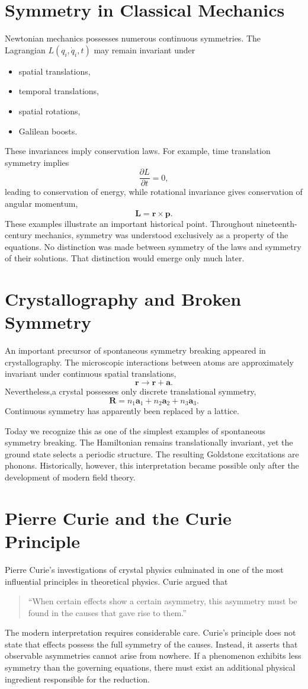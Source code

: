 \section{Symmetry in Classical Mechanics}
Newtonian mechanics possesses numerous continuous symmetries.
The Lagrangian $ L(q_i,\dot q_i,t)$ may remain invariant under
\begin{itemize}
\item spatial translations,
\item temporal translations,
\item spatial rotations,
\item Galilean boosts.
\end{itemize}
These invariances imply conservation laws.
For example,
time translation symmetry implies
\[\frac{\partial L}{\partial t}=0,\]
leading to conservation of energy,
while rotational invariance gives conservation of angular momentum,
\[\mathbf L=\mathbf r\times\mathbf p.\]
These examples illustrate an important historical point.
Throughout nineteenth-century mechanics,
symmetry was understood exclusively as a property of the equations.
No distinction was made between symmetry of the laws and symmetry of
their solutions.
That distinction would emerge only much later.

\section{Crystallography and Broken Symmetry}
An important precursor of spontaneous symmetry breaking appeared in
crystallography.
The microscopic interactions between atoms are approximately invariant
under continuous spatial translations,
\[\mathbf r \rightarrow \mathbf r+\mathbf a.\]
Nevertheless,a crystal possesses only discrete translational symmetry,
\[\mathbf R=n_1\mathbf a_1+n_2\mathbf a_2+n_3\mathbf a_3.\]
Continuous symmetry has apparently been replaced by a lattice.

Today we recognize this as one of the simplest examples of spontaneous
symmetry breaking.
The Hamiltonian remains translationally invariant,
yet the ground state selects a periodic structure.
The resulting Goldstone excitations are phonons.
Historically, however,
this interpretation became possible only after the development of modern
field theory.

\section{Pierre Curie and the Curie Principle}
Pierre Curie's investigations of crystal physics culminated in one of
the most influential principles in theoretical physics.
Curie argued that
\begin{quote}
``When certain effects show a certain asymmetry, this asymmetry must be
found in the causes that gave rise to them.''
\end{quote}
The modern interpretation requires considerable care.
Curie's principle does not state that effects possess the full symmetry
of the causes.
Instead,
it asserts that observable asymmetries cannot arise from nowhere.
If a phenomenon exhibits less symmetry than the governing equations,
there must exist an additional physical ingredient responsible for the
reduction.

